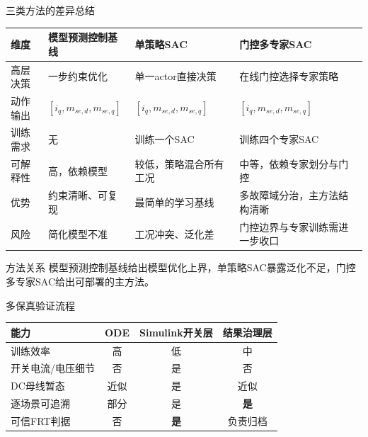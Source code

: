 \documentclass[10pt,aspectratio=169,mathserif]{beamer}
\begin{document}
\begin{frame}{三类方法的差异总结}
\begin{table}
\centering\scriptsize
\begin{tabular}{p{2.1cm}p{2.7cm}p{3.1cm}p{3.1cm}}
\toprule
维度 & 模型预测控制基线 & 单策略SAC & 门控多专家SAC \\
\midrule
高层决策 & 一步约束优化 & 单一actor直接决策 & 在线门控选择专家策略 \\
动作输出 & $[i_q,m_{se,d},m_{se,q}]$ & $[i_q,m_{se,d},m_{se,q}]$ & $[i_q,m_{se,d},m_{se,q}]$ \\
训练需求 & 无 & 训练一个SAC & 训练四个专家SAC \\
可解释性 & 高，依赖模型 & 较低，策略混合所有工况 & 中等，依赖专家划分与门控 \\
优势 & 约束清晰、可复现 & 最简单的学习基线 & 多故障域分治，主方法结构清晰 \\
风险 & 简化模型不准 & 工况冲突、泛化差 & 门控边界与专家训练需进一步收口 \\
\bottomrule
\end{tabular}
\end{table}

\begin{block}{方法关系}
模型预测控制基线给出模型优化上界，单策略SAC暴露泛化不足，门控多专家SAC给出可部署的主方法。
\end{block}
\end{frame}

\begin{frame}{多保真验证流程}
\begin{center}
\end{center}

\begin{table}
\centering\small
\begin{tabular}{lccc}
\toprule
能力 & ODE & Simulink开关层 & 结果治理层 \\
\midrule
训练效率 & 高 & 低 & 中 \\
开关电流/电压细节 & 否 & 是 & 否 \\
DC母线暂态 & 近似 & 是 & 近似 \\
逐场景可追溯 & 部分 & 是 & \textbf{是} \\
可信FRT判据 & 否 & \textbf{是} & 负责归档 \\
\bottomrule
\end{tabular}
\end{table}
\end{frame}
\end{document}
